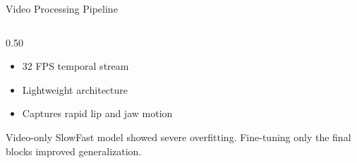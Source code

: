 \documentclass[aspectratio=169, 10pt]{beamer}
\begin{document}
\begin{frame}{Video Processing Pipeline}
\begin{columns}[T,onlytextwidth]
\begin{column}{0.50\textwidth}
\begin{tcolorbox}[
bluecard,
title={\small SLOW Pathway},
boxsep=2pt,
left=3pt,right=3pt,
top=3pt,bottom=3pt]
\end{tcolorbox}

\vspace{2pt}

\begin{tcolorbox}[
tealcard,
title={\small FAST Pathway},
boxsep=2pt,
left=3pt,right=3pt,
top=3pt,bottom=3pt]

\footnotesize
\begin{itemize}[leftmargin=*, itemsep=1pt]
  \item 32 FPS temporal stream
  \item Lightweight architecture
  \item Captures rapid lip and jaw motion
\end{itemize}

\end{tcolorbox}

\vspace{2pt}

\begin{tcolorbox}[
orangecard,
title={\small Training Observation},
boxsep=2pt,
left=3pt,right=3pt,
top=3pt,bottom=3pt]

\footnotesize
Video-only SlowFast model showed severe overfitting.
Fine-tuning only the final blocks improved generalization.

\end{tcolorbox}

\end{column}

\end{columns}

\end{frame}
\end{document}
